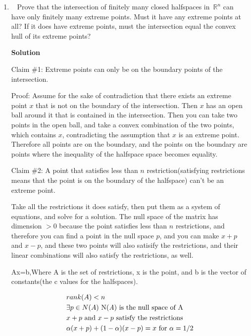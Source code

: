 \documentclass[11pt]{article}
\newcommand\score[1]{\marginpar{\vspace{-2ex}\color{blue}{#1/3}}\hspace{-1ex}}
\newcommand\0{\mathbf{0}}
\newcommand\RR{\mathbb{R}}
\newcommand\<{\langle}
\renewcommand\>{\rangle}
\begin{document}
\begin{enumerate}
For the second part, the answer is yes, because the transformation is invertible, therefore any line in the image can
be mapped back to a line in the original space, if a point is an extreme point in $X$, and not extreme in the image,
then it must be a convex combination of points in the output space, but since the transformation is invertible, you can take the inverse of
the line to show that the point itself couldn't have been an extreme point, contradicting the assumption.

\pagebreak

\item\ \score{}%
Prove that the intersection of finitely many closed halfspaces
in~$\RR^n$ can have only finitely many extreme points.  Must it have
any extreme points at all?  If it does have extreme points, must the
intersection equal the convex hull of its extreme points?

\textbf{Solution}

Claim \#1: Extreme points can only be on the boundary points of the intersection.

Proof: Assume for the sake of contradiction that there exists an extreme point $x$ that is not 
on the boundary of the intersection. Then $x$ has an open ball around it that is contained in the intersection. 
Then you can take two points in the open ball, and take a convex combination of the two points, which contains $x$,
contradicting the assumption that $x$ is an extreme point. Therefore all points are on the 
boundary, and the points on the boundary are points where the inequality of 
the halfspace space becomes equality.

Claim \#2: A point that satisfies less than $n$ restriction(satisfying restrictions means that the point is on the boundary of the halfspace) can't be an extreme point.

Take all the restrictions it does satisfy, then put them as a system of equations, and solve for a solution.
The null space of the matrix has dimension $>0$ because the point satisfies less than $n$ restrictions, and therefore
you can find a point in the null space $p$, and you can make $x+p$ and $x-p$, and these two points will also satisify
the restrictions, and their linear combinations will also satisfy the restrictions, as well.

  Ax=b,Where A is the set of restrictions, x is the point, and b is the vector of constants(the c values for the halfspaces).

\begin{align*}
  &rank(A)< n\\
  &\exists p \in N(A) \text{  N(\textit{A}) is the null space of A}\\
  &x+p \text{ and } x-p \text{ satisfy the restrictions}\\
  &\alpha (x+p) + (1-\alpha)(x-p) = x \text{ for } \alpha = 1/2
\end{align*}


\end{enumerate}
\end{document}
